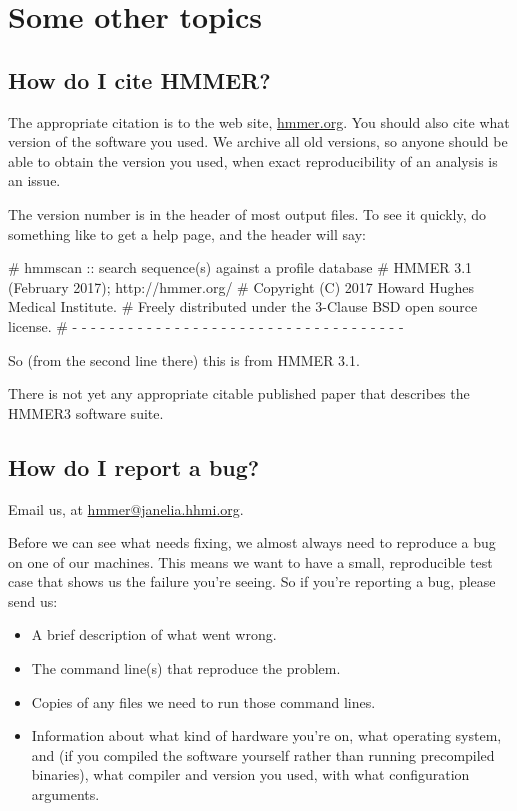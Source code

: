
\section{Some other topics}
\label{section:more}
\setcounter{footnote}{0}

\subsection{How do I cite HMMER?}

The appropriate citation is to the web site, \url{hmmer.org}. You
should also cite what version of the software you used. We archive all
old versions, so anyone should be able to obtain the version you used,
when exact reproducibility of an analysis is an issue. 

The version number is in the header of most output files. To see it
quickly, do something like  to get a help page, and
the header will say:

\begin{sreoutput}
# hmmscan :: search sequence(s) against a profile database
# HMMER 3.1 (February 2017); http://hmmer.org/
# Copyright (C) 2017 Howard Hughes Medical Institute.
# Freely distributed under the 3-Clause BSD open source license.
# - - - - - - - - - - - - - - - - - - - - - - - - - - - - - - - - - - - -
\end{sreoutput}

So (from the second line there) this is from HMMER 3.1.

There is not yet any appropriate citable published paper that
describes the HMMER3 software suite.



\subsection{How do I report a bug?}

Email us, at \url{hmmer@janelia.hhmi.org}.

Before we can see what needs fixing, we almost always need to
reproduce a bug on one of our machines. This means we want to have a
small, reproducible test case that shows us the failure you're seeing.
So if you're reporting a bug, please send us:

\begin{itemize}
 \item A brief description of what went wrong.
 \item The command line(s) that reproduce the problem.
 \item Copies of any files we need to run those command lines.
 \item Information about what kind of hardware you're on, what
   operating system, and (if you compiled the software yourself rather
   than running precompiled binaries), what compiler and version you
   used, with what configuration arguments.
\end{itemize}

